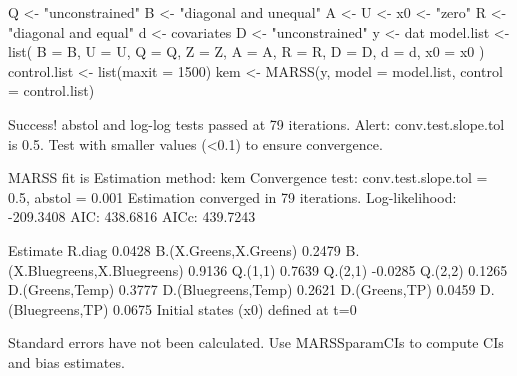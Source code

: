 \begin{Schunk}
\begin{Sinput}
 Q <- "unconstrained"
 B <- "diagonal and unequal"
 A <- U <- x0 <- "zero"
 R <- "diagonal and equal"
 d <- covariates
 D <- "unconstrained"
 y <- dat
 model.list <- list(
   B = B, U = U, Q = Q, Z = Z, A = A,
   R = R, D = D, d = d, x0 = x0
 )
 control.list <- list(maxit = 1500)
 kem <- MARSS(y, model = model.list, control = control.list)
\end{Sinput}
\begin{Soutput}
Success! abstol and log-log tests passed at 79 iterations.
Alert: conv.test.slope.tol is 0.5.
Test with smaller values (<0.1) to ensure convergence.

MARSS fit is
Estimation method: kem 
Convergence test: conv.test.slope.tol = 0.5, abstol = 0.001
Estimation converged in 79 iterations. 
Log-likelihood: -209.3408 
AIC: 438.6816   AICc: 439.7243   
 
                              Estimate
R.diag                          0.0428
B.(X.Greens,X.Greens)           0.2479
B.(X.Bluegreens,X.Bluegreens)   0.9136
Q.(1,1)                         0.7639
Q.(2,1)                        -0.0285
Q.(2,2)                         0.1265
D.(Greens,Temp)                 0.3777
D.(Bluegreens,Temp)             0.2621
D.(Greens,TP)                   0.0459
D.(Bluegreens,TP)               0.0675
Initial states (x0) defined at t=0

Standard errors have not been calculated. 
Use MARSSparamCIs to compute CIs and bias estimates.
\end{Soutput}
\end{Schunk}
